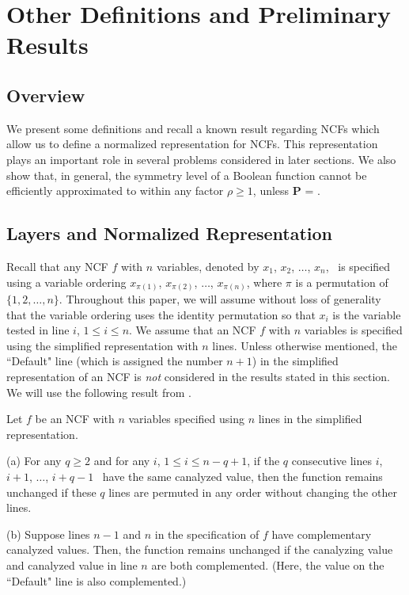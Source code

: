 \section{Other Definitions and Preliminary Results}
\label{sec:prelim}

\subsection{Overview}

We present some definitions and recall
a known result regarding NCFs which allow us
to define a normalized representation for NCFs.
This representation plays an important role in several
problems considered in later sections.
We also show that, in general, the symmetry level
of a Boolean function cannot be efficiently approximated to within any
factor $\rho \geq 1$, unless \textbf{P} = \cnp.

\medskip

\subsection{Layers and Normalized Representation}
\label{sse:ncf_layer}

Recall that any NCF $f$ with $n$ variables,
denoted by $x_1$, $x_2$, $\ldots$, $x_n$,~
is specified using a variable ordering 
$x_{\pi(1)}$, $x_{\pi(2)}$, $\ldots$,  $x_{\pi(n)}$,
where $\pi$ is a permutation of $\{1, 2, \ldots, n\}$.
Throughout this paper, we will assume without loss of generality
that the variable ordering uses the identity permutation 
so that $x_i$ is the variable tested in line $i$, $1 \leq i \leq n$. 
We assume that an NCF $f$ with $n$
variables is specified using the simplified representation with $n$ lines. 
Unless otherwise mentioned, the ``Default" line (which is assigned the number $n+1$)
in the simplified representation of an NCF is \emph{not} considered
in the results stated in this section.
We will use the following result from \cite{Stearns-etal-2018}.

\begin{observation} \label{obs:ncf_transformations}
Let $f$ be an NCF with $n$ variables specified using $n$ lines
in the simplified representation. 
\begin{description}
\item{(a)} 
For any $q \geq 2$ and for any $i$, $1 \leq i \leq n-q+1$,
if the $q$ consecutive lines $i$, $i+1$, $\ldots$, $i+q-1$~
have the same canalyzed value, then the function remains
unchanged if these $q$ lines are permuted in any order
without changing the other lines.

\item{(b)} 
Suppose lines $n-1$ and $n$ in the specification of $f$ 
have complementary canalyzed values.
Then, the function remains unchanged 
if the canalyzing value and canalyzed value in line $n$
are both complemented. 
(Here, the value on the ``Default" line is also complemented.)
\QED
\end{description}
\end{observation}

